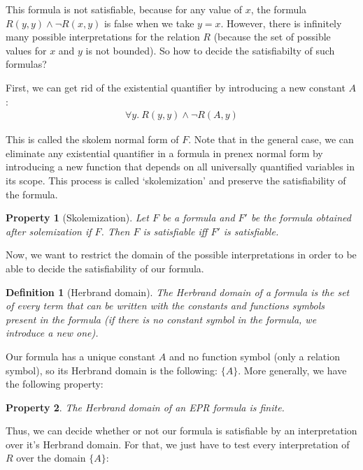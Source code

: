 \documentclass[11pt,a4paper,oldfontcommands,openany]{memoir}
\newtheorem*{definition}{Definition}
\newtheorem*{property}{Property}
\begin{document}
        This formula is not satisfiable, because for any value of \(x\), the formula \(R(y,y) \land \neg R(x,y)\) is false when we take \(y=x\).
        However, there is infinitely many possible interpretations for the relation \(R\) (because the set of possible values for \(x\) and \(y\) is not bounded).
        So how to decide the satisfiabilty of such formulas?

        First, we can get rid of the existential quantifier by introducing a new constant \(A\):
        \begin{align*}
            \forall y. \ R(y,y) \land \neg R(A,y)
        \end{align*}

        This is called the skolem normal form of \(F\).
        Note that in the general case, we can eliminate any existential quantifier in a formula in prenex normal form by introducing a new function
        that depends on all universally quantified variables in its scope. This process is called `skolemization' and preserve the satisfiability of the formula.

        \begin{property}[Skolemization]
            Let \(F\) be a formula and \(F'\) be the formula obtained after solemization if \(F\). Then \(F\) is satisfiable iff \(F'\) is satisfiable.
        \end{property}

        Now, we want to restrict the domain of the possible interpretations in order to be able to decide the satisfiability of our formula.

        \begin{definition}[Herbrand domain]
            The Herbrand domain of a formula is the set of every term that can be written with the constants and functions symbols present in the formula
            (if there is no constant symbol in the formula, we introduce a new one).
        \end{definition}

        Our formula has a unique constant \(A\) and no function symbol (only a relation symbol), so its Herbrand domain is the following:
        \( \{A\} \). More generally, we have the following property:
        
        \begin{property}
        The Herbrand domain of an EPR formula is finite.
        \end{property}

        Thus, we can decide whether or not our formula is satisfiable by an interpretation over it's Herbrand domain.
        For that, we just have to test every interpretation of \(R\) over the domain \( \{A\} \):
\end{document}
